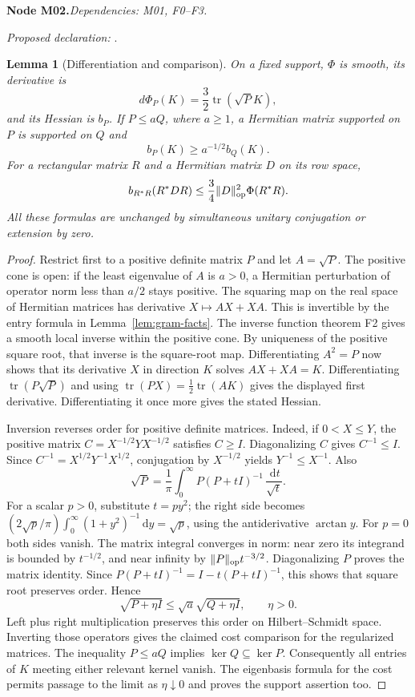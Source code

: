 \documentclass[11pt]{article}
\newtheorem{lemma}[theorem]{Lemma}
\theoremstyle{remark}\newtheorem{remark}[theorem]{Remark}
\newcommand{\dd}{\,\mathrm d}\newcommand{\tr}{\operatorname{tr}}
\newcommand{\bpnode}[3]{\par\Needspace{5\baselineskip}\noindent\textbf{Node #1.}\quad\textit{Dependencies: #2.}\par\noindent\textit{Proposed declaration:} \texttt{\detokenize{#3}}.\par\smallskip}
\begin{document}
\bpnode{M02}{M01, F0--F3}{matrix_cost_differentiation_order_insertion}
\begin{lemma}[Differentiation and comparison]\label{lem:matrix-basic}
On a fixed support, $\Phi$ is smooth, its derivative is
\[
 d\Phi_P(K)=\frac32\tr(\sqrt P K),
\]
and its Hessian is $b_P$. If $P\leq aQ$, where $a\geq1$, a Hermitian matrix supported on $P$ is supported on $Q$ and
\[
 b_P(K)\geq a^{-1/2}b_Q(K).
\]
For a rectangular matrix $R$ and a Hermitian matrix $D$ on its row space,
\[
 b_{R^*R}(R^*DR)\leq\frac34\|D\|_{\mathrm{op}}^2\Phi(R^*R).
\]
All these formulas are unchanged by simultaneous unitary conjugation or extension by zero.
\end{lemma}
\begin{proof}
Restrict first to a positive definite matrix $P$ and let $A=\sqrt P$. The positive cone is open: if the least eigenvalue of $A$ is $a>0$, a Hermitian perturbation of operator norm less than $a/2$ stays positive. The squaring map on the real space of Hermitian matrices has derivative $X\mapsto AX+XA$. This is invertible by the entry formula in Lemma~\ref{lem:gram-facts}. The inverse function theorem F2 gives a smooth local inverse within the positive cone. By uniqueness of the positive square root, that inverse is the square-root map. Differentiating $A^2=P$ now shows that its derivative $X$ in direction $K$ solves $AX+XA=K$. Differentiating $\tr(P\sqrt P)$ and using $\tr(PX)=\frac12\tr(AK)$ gives the displayed first derivative. Differentiating it once more gives the stated Hessian.

Inversion reverses order for positive definite matrices. Indeed, if $0<X\le Y$, the positive matrix $C=X^{-1/2}YX^{-1/2}$ satisfies $C\ge I$. Diagonalizing $C$ gives $C^{-1}\le I$. Since $C^{-1}=X^{1/2}Y^{-1}X^{1/2}$, conjugation by $X^{-1/2}$ yields $Y^{-1}\le X^{-1}$. Also
\[
 \sqrt P=\frac1\pi\int_0^\infty P(P+tI)^{-1}\,\frac{\dd t}{\sqrt t}.
\]
For a scalar $p>0$, substitute $t=py^2$; the right side becomes $(2\sqrt p/\pi)\int_0^\infty(1+y^2)^{-1}\dd y=\sqrt p$, using the antiderivative $\arctan y$. For $p=0$ both sides vanish. The matrix integral converges in norm: near zero its integrand is bounded by $t^{-1/2}$, and near infinity by $\|P\|_{\mathrm{op}}t^{-3/2}$. Diagonalizing $P$ proves the matrix identity. Since $P(P+tI)^{-1}=I-t(P+tI)^{-1}$, this shows that square root preserves order. Hence
\[
 \sqrt{P+\eta I}\leq\sqrt a\sqrt{Q+\eta I},\qquad \eta>0.
\]
Left plus right multiplication preserves this order on Hilbert--Schmidt space. Inverting those operators gives the claimed cost comparison for the regularized matrices. The inequality $P\leq aQ$ implies $\ker Q\subseteq\ker P$. Consequently all entries of $K$ meeting either relevant kernel vanish. The eigenbasis formula for the cost permits passage to the limit as $\eta\downarrow0$ and proves the support assertion too.


\end{proof}
\end{document}
